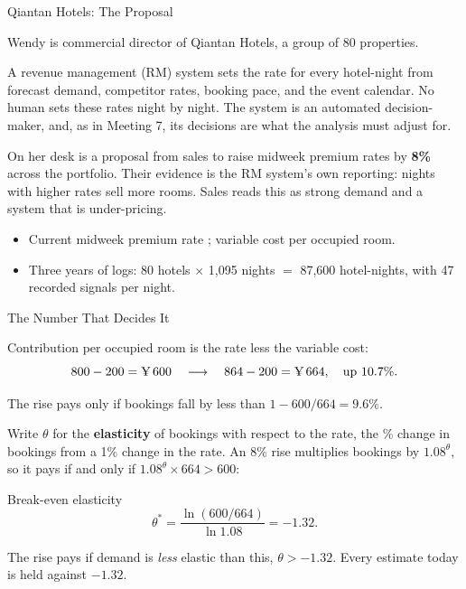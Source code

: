 \documentclass[aspectratio=169, 11pt, handout]{beamer}
\begin{document}
\begin{frame}{Qiantan Hotels: The Proposal}

Wendy is commercial director of Qiantan Hotels, a group of 80 properties.

\bigskip

A revenue management (RM) system sets the rate for every hotel-night from forecast demand, competitor rates, booking pace, and the event calendar. No human sets these rates night by night. The system is an automated decision-maker, and, as in Meeting 7, its decisions are what the analysis must adjust for.

\bigskip

On her desk is a proposal from sales to raise midweek premium rates by \textbf{8\%} across the portfolio. Their evidence is the RM system's own reporting: nights with higher rates sell more rooms. Sales reads this as strong demand and a system that is under-pricing.

\bigskip

\begin{itemize}
  \item Current midweek premium rate ; variable cost  per occupied room.
  \item Three years of logs: 80 hotels $\times$ 1{,}095 nights $=$ 87{,}600 hotel-nights, with 47 recorded signals per night.
\end{itemize}
\end{frame}

\begin{frame}{The Number That Decides It}

Contribution per occupied room is the rate less the variable cost:
\[
800 - 200 = \text{\textyen}\,600 \quad\longrightarrow\quad 864 - 200 = \text{\textyen}\,664, \quad \text{up } 10.7\%.
\]

The rise pays only if bookings fall by less than $1 - 600/664 = 9.6\%$.

\bigskip

Write $\theta$ for the \textbf{elasticity} of bookings with respect to the rate, the \% change in bookings from a 1\% change in the rate. An 8\% rise multiplies bookings by $1.08^{\theta}$, so it pays if and only if $1.08^{\theta} \times 664 > 600$:

\begin{alertblock}{Break-even elasticity}
\[
\theta^{\ast} = \frac{\ln(600/664)}{\ln 1.08} = -1.32 .
\]
\end{alertblock}

\medskip

The rise pays if demand is \emph{less} elastic than this, $\theta > -1.32$. Every estimate today is held against $-1.32$.
\end{frame}
\end{document}
